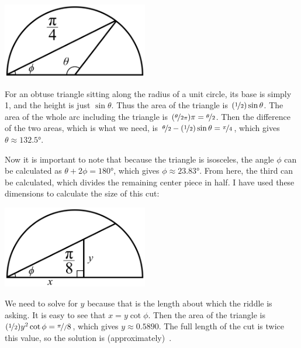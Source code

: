 \documentclass{article}
\begin{document}
\vspace{0.1in}
\begin{center}
\includegraphics[width=2.5in]{first_cut.png}
\end{center}
\vspace{0.1in}

For an obtuse triangle sitting along the radius of a unit circle, its base is simply 1, and the height is just $\sin\theta$.
Thus the area of the triangle is $(\nicefrac{1}{2})\sin\theta$.
The area of the whole arc including the triangle is $(\nicefrac{\theta}{2\pi})\pi=\nicefrac{\theta}{2}$.
Then the difference of the two areas, which is what we need, is $\nicefrac{\theta}{2}-(\nicefrac{1}{2})\sin\theta=\nicefrac{\pi}{4}$, which gives $\theta\approx\ang{132.5}$.

Now it is important to note that because the triangle is isosceles, the angle $\phi$ can be calculated as $\theta+2\phi=\ang{180}$, which gives $\phi\approx\ang{23.83}$.
From here, the third can be calculated, which divides the remaining center piece in half.
I have used these dimensions to calculate the size of this cut:

\vspace{0.1in}
\begin{center}
\includegraphics[width=2.5in]{second_cut.png}
\end{center}
\vspace{0.1in}

We need to solve for $y$ because that is the length about which the riddle is asking.
It is easy to see that $x=y\cot\phi$.
Then the area of the triangle is $(\nicefrac{1}{2})y^{2}\cot\phi=\nicefrac{\pi}/8$, which gives $y\approx0.5890$.
The full length of the cut is twice this value, so the solution is (approximately)
\,.
\end{document}
